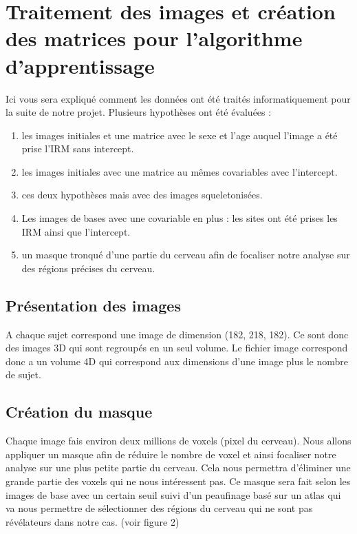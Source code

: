 \section{Traitement des images et création des matrices pour l'algorithme d'apprentissage}

Ici vous sera expliqué comment les données ont été traités informatiquement pour la suite de notre projet.
Plusieurs hypothèses ont été évaluées : 
\begin{enumerate}
	\item les images initiales et une matrice avec le sexe et l'age auquel l'image a été prise l'IRM sans intercept.
	\item les images initiales avec une matrice au mêmes covariables avec l'intercept. 
	\item ces deux hypothèses mais avec des images squeletonisées.
	\item Les images de bases avec une covariable en plus : les sites ont été prises les IRM ainsi que l'intercept. 
	\item un masque tronqué d'une partie du cerveau afin de focaliser notre analyse sur des régions précises du cerveau.  
\end{enumerate}

\subsection{Présentation des images}

A chaque sujet correspond une image de dimension (182, 218, 182). Ce sont donc des images 3D qui sont regroupés en un seul volume. Le fichier image correspond donc a un volume 4D qui correspond aux dimensions d'une image plus le nombre de sujet.

\subsection{Création du masque}

Chaque image fais environ deux millions de voxels (pixel du cerveau). Nous allons appliquer un masque afin de réduire le nombre de voxel et ainsi focaliser notre analyse sur une plus petite partie du cerveau. Cela nous permettra d'éliminer une grande partie des voxels qui ne nous intéressent pas. 
Ce masque sera fait selon les images de base avec un certain seuil suivi d'un peaufinage basé sur un atlas qui va nous permettre de sélectionner des régions du cerveau qui ne sont pas révélateurs dans notre cas. (voir figure 2)

